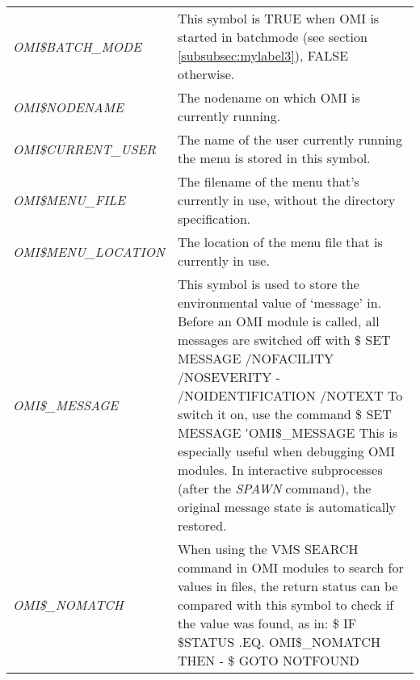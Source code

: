 \documentclass[a4paper]{book}
\renewcommand{\indent}{\hspace*{5mm}}
\begin{document}
\begin{table}[h!tb]
\begin{minipage}[h!tb]{\textwidth}
\begin{tabular}{lp{9cm}}
\textsl{OMI{\$}BATCH{\_}MODE}\index{OMI mode!batch}\index{batch mode}\index{OMI{\$}BATCH{\_}MODE} & 
This symbol is TRUE when OMI is started in batchmode (see section \ref{subsubsec:mylabel3}), FALSE otherwise. \\
\textsl{OMI{\$}NODENAME}\index{nodename}\index{OMI{\$}NODENAME} & 
The nodename on which OMI is currently running. \\
\textsl{OMI{\$}CURRENT{\_}USER}\index{username}\index{OMI{\$}CURRENT{\_}USER}\index{OMI symbols!local symbols!OMI{\$}CURRENT{\_}USER} & 
The name of the user currently running the menu is stored in this symbol. \\
\textsl{OMI{\$}MENU{\_}FILE}\index{menu!filename}\index{OMI{\$}MENU{\_}FILE}\index{OMI symbols!local symbols!OMI{\$}MENU{\_}FILE} & 
The filename of the menu that's currently in use, without the directory specification. \\
\textsl{OMI{\$}MENU{\_}LOCATION}\index{OMI{\$}MENU{\_}LOCATION}\index{OMI symbols!local symbols!OMI{\$}MENU{\_}LOCATION} & 
The location of the menu file that is currently in use. \\
\textsl{OMI{\$}{\_}MESSAGE}\index{OMI commands in modules!debugging}\index{OMI{\$}{\_}MESSAGE}\index{OMI symbols!local symbols!OMI{\$}{\_}MESSAGE} & 
This symbol is used to store the environmental value of `message' in. Before
an OMI module is called, all messages are switched off with \newline
\indent\small{\textsf{{\$} SET MESSAGE /NOFACILITY /NOSEVERITY -}} \newline
\indent\indent\small{\textsf{/NOIDENTIFICATION /NOTEXT}} \newline
To switch it on, use the command \newline
\indent\small{\textsf{{\$} SET MESSAGE \'{}OMI{\$}{\_}MESSAGE}} \newline
This is especially useful when debugging OMI modules. In interactive subprocesses
(after the \textsl{SPAWN} command), the original message state is
automatically restored. \\
\textsl{OMI{\$}{\_}NOMATCH}\index{OMI{\$}{\_}NOMATCH}\index{OMI symbols!local symbols!OMI{\$}{\_}NOMATCH} & 
When using the VMS SEARCH command in OMI modules to search for 
values in files, the return status can be compared with this 
symbol to check if the value was found, as in: \linebreak
\indent\small{\textsf{{\$} IF {\$}STATUS .EQ. OMI{\$}{\_}NOMATCH THEN -}}\newline
\indent\indent\small{\textsf{{\$} GOTO NOTFOUND}}\\

\end{tabular}
\end{minipage}
\end{table}
\end{document}
